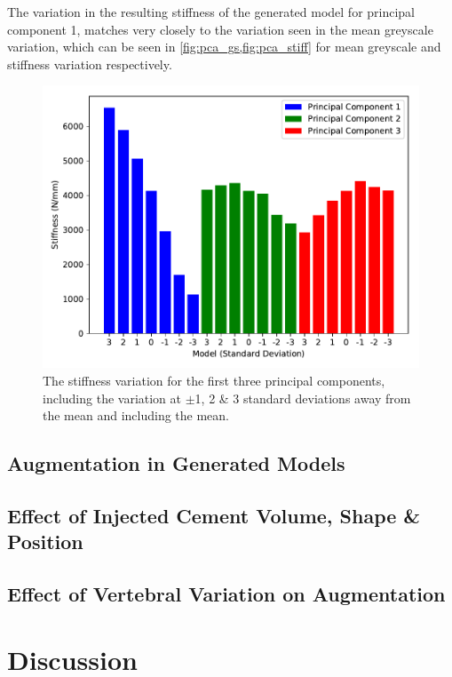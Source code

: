 The variation in the resulting stiffness of the generated model for principal component 1, matches very closely to the variation seen in the mean greyscale variation, which can be seen in \cref{fig:pca_gs,fig:pca_stiff} for mean greyscale and stiffness variation respectively.

\begin{figure}[h]
  \centering
  \includegraphics[width=.9\textwidth]{Chapters/Chapter_PCA_images/pca_stiff.pdf}
  \caption{The stiffness variation for the first three principal components, including the variation at $\pm$1, 2 \& 3 standard deviations away from the mean and including the mean.}
  \label{fig:pca_stiff}
\end{figure}

\subsection{Augmentation in Generated Models}
\subsection{Effect of Injected Cement Volume, Shape \& Position}



\subsection{Effect of Vertebral Variation on Augmentation}

\section{Discussion}
\label{pca_disc}

